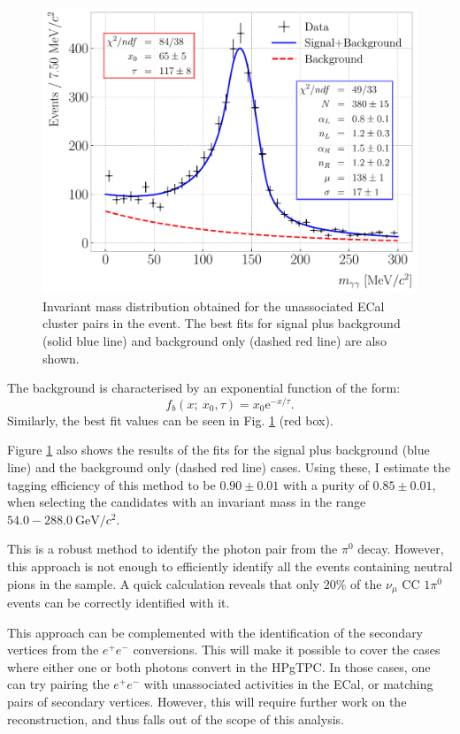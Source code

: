 \begin{figure}[t]
    \centering
    \includegraphics[width=.80\linewidth]{Images/GAr_selection/numuCC_1pizero_selection.pdf}
    \caption[Invariant mass distribution obtained for the unassociated ECal cluster pairs in the event.]{Invariant mass distribution obtained for the unassociated ECal cluster pairs in the event. The best fits for signal plus background (solid blue line) and background only (dashed red line) are also shown.}
    \label{fig:pizero_invariant_mass}
\end{figure}

The background is characterised by an exponential function of the form:
\begin{equation}
    f_{b} (x; ~x_{0}, \tau) = x_{0} \mathrm{e}^{-x/\tau}.
\end{equation}
Similarly, the best fit values can be seen in Fig. \ref{fig:pizero_invariant_mass} (red box).

Figure \ref{fig:pizero_invariant_mass} also shows the results of the fits for the signal plus background (blue line) and the background only (dashed red line) cases. Using these, I estimate the tagging efficiency of this method to be $0.90 \pm 0.01$ with a purity of $0.85 \pm 0.01$, when selecting the candidates with an invariant mass in the range $54.0-288.0~\mathrm{GeV}/c^{2}$.

This is a robust method to identify the photon pair from the $\pi^{0}$ decay. However, this approach is not enough to efficiently identify all the events containing neutral pions in the sample. A quick calculation reveals that only $20\%$ of the $\nu_{\mu}$ CC $1\pi^{0}$ events can be correctly identified with it.

This approach can be complemented with the identification of the secondary vertices from the $e^{+}e^{-}$ conversions. This will make it possible to cover the cases where either one or both photons convert in the HPgTPC. In those cases, one can try pairing the $e^{+}e^{-}$ with unassociated activities in the ECal, or matching pairs of secondary vertices. However, this will require further work on the reconstruction, and thus falls out of the scope of this analysis.

